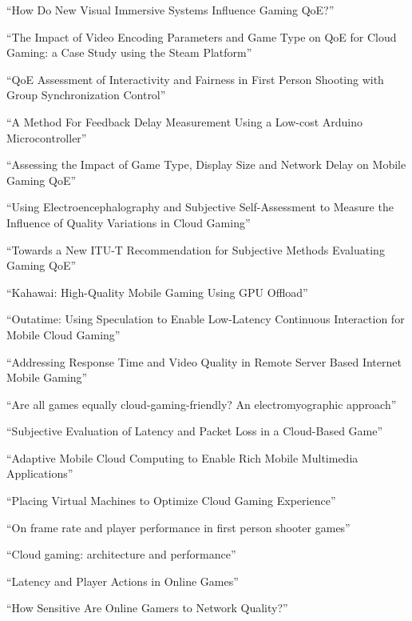 ``How Do New Visual Immersive Systems Influence Gaming QoE?'' \cite{7148110}

``The Impact of Video Encoding Parameters and Game Type on QoE for Cloud Gaming: a Case Study using the Steam Platform'' \cite{slivarimpact}

``QoE Assessment of Interactivity and Fairness in First Person Shooting with Group Synchronization Control'' \cite{Ida:2010:QAI:1944796.1944806}

``A Method For Feedback Delay Measurement Using a Low-cost Arduino Microcontroller'' \cite{beyermethod}

``Assessing the Impact of Game Type, Display Size and Network Delay on Mobile Gaming QoE'' \cite{beyer2014typedisplaydelayimpact}

``Using Electroencephalography and Subjective Self-Assessment to Measure the Influence of Quality Variations in Cloud Gaming'' \cite{beyerusing}

``Towards a New {ITU-T} Recommendation for Subjective Methods Evaluating Gaming {QoE}'' \cite{mollertowards}

``Kahawai: High-Quality Mobile Gaming Using GPU Offload'' \cite{Cuervo:2015:KHM:2742647.2742657}

``Outatime: Using Speculation to Enable Low-Latency Continuous Interaction for Mobile Cloud Gaming'' \cite{Lee:2015:OUS:2742647.2742656}

``Addressing Response Time and Video Quality in Remote Server Based Internet Mobile Gaming'' \cite{5506572}

``Are all games equally cloud-gaming-friendly? An electromyographic approach'' \cite{6404025}

``Subjective Evaluation of Latency and Packet Loss in a Cloud-Based Game'' \cite{6614351}

``Adaptive Mobile Cloud Computing to Enable Rich Mobile Multimedia Applications'' \cite{6413270}

``Placing Virtual Machines to Optimize Cloud Gaming Experience'' \cite{6853364}

``On frame rate and player performance in first person shooter games'' \cite{claypool2007}

``Cloud gaming: architecture and performance'' \cite{6574660}

``Latency and Player Actions in Online Games'' \cite{Claypool:2006:LPA:1167838.1167860}

``How Sensitive Are Online Gamers to Network Quality?'' \cite{Chen:2006:SOG:1167838.1167859}

